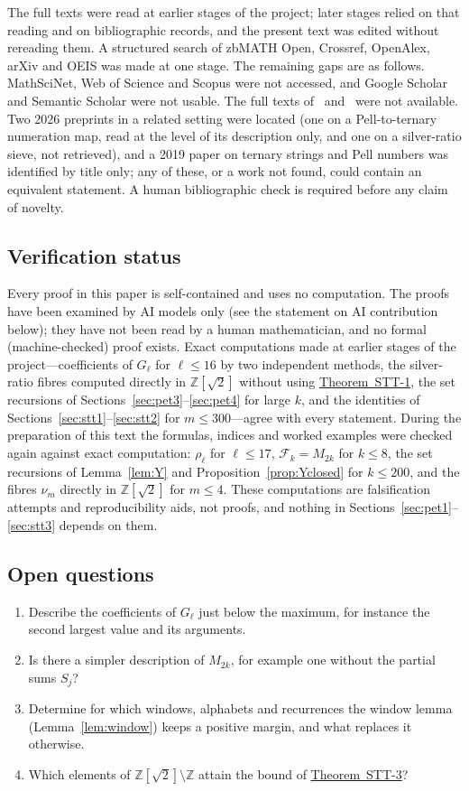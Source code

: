 \documentclass[11pt]{amsart}
\theoremstyle{definition}
\theoremstyle{remark}
\theoremstyle{plain}
\numberwithin{equation}{section}
\newcommand{\Z}{\mathbb{Z}}
\newcommand{\Fam}{\mathcal{F}}
\newcommand{\STTone}{\hyperref[thm:stt1]{Theorem~STT-1}}
\newcommand{\STTthree}{\hyperref[thm:stt3]{Theorem~STT-3}}
\begin{document}
The full texts were read at earlier stages of the project; later stages relied on that reading and
on bibliographic records, and the present text was edited without rereading them. A structured
search of zbMATH Open, Crossref, OpenAlex, arXiv and OEIS was made at one stage. The remaining gaps
are as follows. MathSciNet, Web of Science and Scopus were not accessed, and Google Scholar and
Semantic Scholar were not usable. The full texts of~\cite{Horadam1996} and~\cite{Edson2013} were
not available. Two 2026 preprints in a related
setting were located (one on a Pell-to-ternary numeration map, read at the level of its description
only, and one on a silver-ratio sieve, not retrieved), and a 2019 paper on ternary strings and Pell
numbers was identified by title only; any of these, or a work not found, could contain an equivalent
statement. A human bibliographic check is required before any claim of novelty.

\subsection{Verification status}\label{sec:verification}
Every proof in this paper is self-contained and uses no computation. The proofs have been examined
by AI models only (see the statement on AI contribution below); they have not been read by a human
mathematician, and no formal (machine-checked) proof exists. Exact computations made at earlier
stages of the project---coefficients of $G_\ell$ for $\ell\le16$ by two independent methods, the
silver-ratio fibres computed directly in $\Z[\sqrt2]$ without using \STTone, the set recursions of
Sections~\ref{sec:pet3}--\ref{sec:pet4} for large $k$, and the identities of
Sections~\ref{sec:stt1}--\ref{sec:stt2} for $m\le300$---agree with every statement. During the
preparation of this text the formulas, indices and worked examples were checked again against exact
computation: $\rho_\ell$ for $\ell\le17$, $\Fam_k=M_{2k}$ for $k\le8$, the set recursions of
Lemma~\ref{lem:Y} and Proposition~\ref{prop:Yclosed} for $k\le200$, and the fibres $\nu_m$ directly in
$\Z[\sqrt2]$ for $m\le4$. These computations are falsification attempts and reproducibility aids,
not proofs, and nothing in Sections~\ref{sec:pet1}--\ref{sec:stt3} depends on them.

\subsection{Open questions}
\begin{enumerate}[label=(\arabic*)]
\item Describe the coefficients of $G_\ell$ just below the maximum, for instance the second largest
value and its arguments.
\item Is there a simpler description of $M_{2k}$, for example one without the partial sums $S_j$?
\item Determine for which windows, alphabets and recurrences the window lemma
(Lemma~\ref{lem:window}) keeps a positive margin, and what replaces it otherwise.
\item Which elements of $\Z[\sqrt2]\setminus\Z$ attain the bound of \STTthree?
\end{enumerate}
\end{document}
